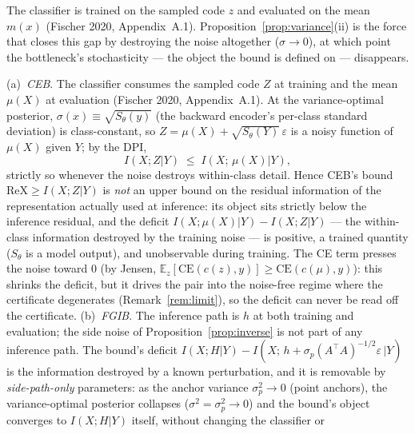 \begin{remark}\label{rem:mismatch}
The classifier is trained on the sampled code $z$ and evaluated on the mean $m(x)$
(Fischer 2020, Appendix~A.1). Proposition~\ref{prop:variance}(ii) is the force that
closes this gap by destroying the noise altogether ($\sigma \to 0$), at which point the
bottleneck's stochasticity --- the object the bound is defined on --- disappears.
\end{remark}

\begin{proposition}\label{prop:object}
(a)~\emph{CEB}. The classifier consumes the sampled code $Z$ at training and the mean
$\mu(X)$ at evaluation (Fischer 2020, Appendix~A.1). At the variance-optimal posterior,
$\sigma(x) \equiv \sqrt{S_\theta(y)}$ (the backward encoder's per-class standard
deviation) is class-constant, so $Z = \mu(X) + \sqrt{S_\theta(Y)}\,\varepsilon$ is a
noisy function of $\mu(X)$ given $Y$; by the DPI,
\begin{equation}
I(X; Z | Y) \;\le\; I(X;\, \mu(X) | Y) ,
\label{eq:dpi}
\end{equation}
strictly so whenever the noise destroys within-class detail. Hence CEB's bound
$\mathrm{ReX} \ge I(X;Z|Y)$ is \emph{not} an upper bound on the residual information of
the representation actually used at inference: its object sits strictly below the
inference residual, and the deficit $I(X;\mu(X)|Y) - I(X;Z|Y)$ --- the within-class
information destroyed by the training noise --- is positive, a trained quantity
($S_\theta$ is a model output), and unobservable during training. The CE term presses the
noise toward $0$ (by Jensen,
$\mathbb{E}_z[\mathrm{CE}(c(z),y)] \ge \mathrm{CE}(c(\mu),y)$): this shrinks the
deficit, but it drives the pair into the noise-free regime where the certificate
degenerates (Remark~\ref{rem:limit}), so the deficit can never be read
off the certificate.
(b)~\emph{FGIB}. The inference path is $h$ at both training and evaluation; the side
noise of Proposition~\ref{prop:inverse} is not part of any inference path. The bound's
deficit $I(X;H|Y) - I(X;\,h+\sigma_p(A^{\top}A)^{-1/2}\varepsilon\,|Y)$ is the
information destroyed by a known perturbation, and it is removable by
\emph{side-path-only} parameters: as the anchor variance $\sigma_p^2 \to 0$ (point
anchors), the variance-optimal posterior collapses ($\sigma^2 = \sigma_p^2 \to 0$) and
the bound's object converges to $I(X;H|Y)$ itself, without changing the classifier or

\end{proposition}
